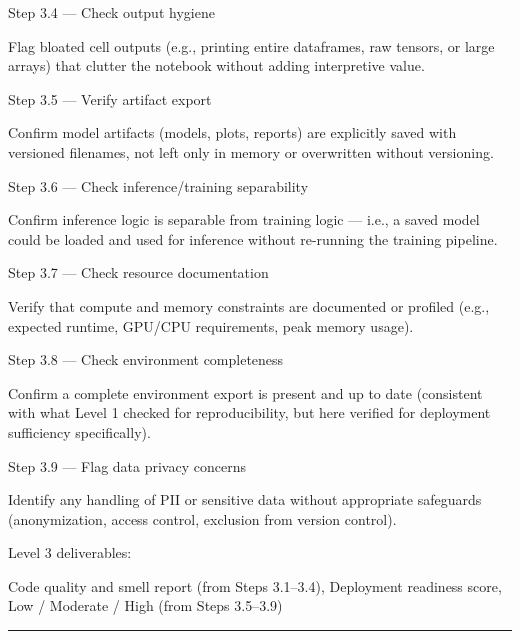 \documentclass[11pt, a4paper]{article}
\begin{document}
Step 3.4 — Check output hygiene

Flag bloated cell outputs (e.g., printing entire dataframes, raw tensors, or large arrays) that clutter the notebook without adding interpretive value.

Step 3.5 — Verify artifact export

Confirm model artifacts (models, plots, reports) are explicitly saved with versioned filenames, not left only in memory or overwritten without versioning.

Step 3.6 — Check inference/training separability

Confirm inference logic is separable from training logic — i.e., a saved model could be loaded and used for inference without re-running the training pipeline.

Step 3.7 — Check resource documentation

Verify that compute and memory constraints are documented or profiled (e.g., expected runtime, GPU/CPU requirements, peak memory usage).

Step 3.8 — Check environment completeness

Confirm a complete environment export is present and up to date (consistent with what Level 1 checked for reproducibility, but here verified for deployment sufficiency specifically).

Step 3.9 — Flag data privacy concerns

Identify any handling of PII or sensitive data without appropriate safeguards (anonymization, access control, exclusion from version control).

Level 3 deliverables:

Code quality and smell report (from Steps 3.1–3.4),
Deployment readiness score, Low / Moderate / High (from Steps 3.5–3.9)

\vspace{.3cm}
\rule{\textwidth}{0.3pt}
\end{document}
